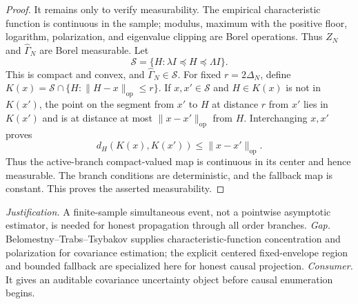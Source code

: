 \documentclass{article}
\begin{document}
\begin{proof}
It remains only to verify measurability.  The empirical characteristic function is continuous in the sample; modulus, maximum with the positive floor, logarithm, polarization, and eigenvalue clipping are Borel operations.  Thus \(Z_N\) and \(\widehat\Gamma_N\) are Borel measurable.  Let
\[
 \mathcal S=\{H:\lambda I\preceq H\preceq\Lambda I\}.
\]
This is compact and convex, and \(\widehat\Gamma_N\in\mathcal S\).  For fixed \(r=2\Delta_N\), define \(K(x)=\mathcal S\cap\{H:\|H-x\|_{\mathrm{op}}\le r\}\).  If \(x,x'\in\mathcal S\) and \(H\in K(x)\) is not in \(K(x')\), the point on the segment from \(x'\) to \(H\) at distance \(r\) from \(x'\) lies in \(K(x')\) and is at distance at most \(\|x-x'\|_{\mathrm{op}}\) from \(H\).  Interchanging \(x,x'\) proves
\[
 d_H(K(x),K(x'))\le\|x-x'\|_{\mathrm{op}}.
\]
Thus the active-branch compact-valued map is continuous in its center and hence measurable.  The branch conditions are deterministic, and the fallback map is constant.  This proves the asserted measurability.
\end{proof}
\par\smallskip\noindent \textit{Justification.} A finite-sample simultaneous event, not a pointwise asymptotic estimator, is needed for honest propagation through all order branches. \textit{Gap.} Belomestny--Trabs--Tsybakov supplies characteristic-function concentration and polarization for covariance estimation; the explicit centered fixed-envelope region and bounded fallback are specialized here for honest causal projection. \textit{Consumer.} It gives an auditable covariance uncertainty object before causal enumeration begins.
\end{document}
